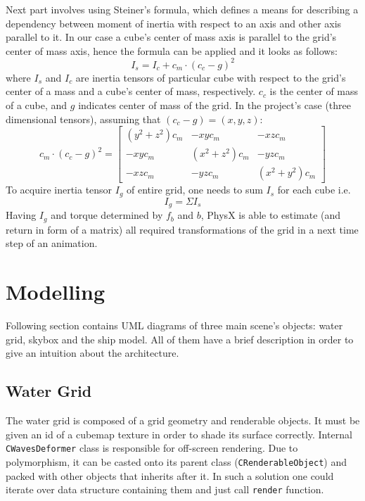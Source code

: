 \documentclass{report}
\begin{document}
Next part involves using Steiner's formula, which defines a means for describing a dependency between moment of inertia with respect to an axis and other axis parallel to it. In our case a cube's center of mass axis is parallel to the grid's center of mass axis, hence the formula can be applied and it looks as follows:
\[
I_s = I_c + c_m \cdot (c_c-g)^{2}
\]
where $I_s$ and $I_c$ are inertia tensors of particular cube with respect to the grid's center of a mass and a cube's center of mass, respectively. $c_c$ is the center of mass of a cube, and $g$ indicates center of mass of the grid. In the project's case (three dimensional tensors), assuming that $(c_c - g) = (x, y, z)$:
\[
c_m \cdot (c_c-g)^{2} =
  \begin{bmatrix}
    (y^2 + z^2)c_m & -x y c_m & -x z c_m \\
    -x y c_m & (x^2 + z^2)c_m & -y z c_m \\
    -x z c_m  & -y z c_m & (x^2 + y^2)c_m
  \end{bmatrix}
\]
To acquire inertia tensor $I_g$ of entire grid, one needs to sum $I_s$ for each cube i.e. 
\[
I_g = \Sigma I_s
\]
Having $I_g$ and torque determined by $f_b$ and $b$, PhysX is able to estimate (and return in form of a matrix) all required transformations of the grid in a next time step of an animation.
\newpage
\section{Modelling} \label{sec:model}
Following section contains UML diagrams of three main scene's objects: water grid, skybox and the ship model. All of them have a brief description  in order to give an intuition about the architecture. 

\subsection{Water Grid}
The water grid is composed of a grid geometry and renderable objects. It must be given an id of a cubemap texture in order to shade its surface correctly. Internal \texttt{CWavesDeformer} class is responsible for off-screen rendering. Due to polymorphism, it can be casted onto its parent class (\texttt{CRenderableObject}) and packed with other objects that inherits after it. In such a solution one could iterate over data structure containing them and just call \texttt{render} function.
\end{document}
